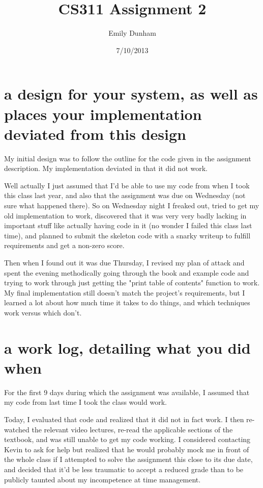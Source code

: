 \documentclass[10pt]{article}
\title{CS311 Assignment 2}
\author{Emily Dunham}
\date{7/10/2013}
\begin{document}
\maketitle

\section{a design for your system, as well as places your implementation deviated from this design}

My initial design was to follow the outline for the code given in the
assignment description. My implementation deviated in that it did not work.

Well actually I just assumed that I'd be able to use my code from when I took this class
last year, and also that the assignment was due on Wednesday (not sure what happened there). 
So on Wednesday night I freaked out, tried to get my old implementation to work, discovered 
that it was very very badly lacking in important stuff like actually having code in it (no wonder 
I failed this class last time), and planned to submit the skeleton code with a snarky writeup
to fulfill requirements and get a non-zero score. 

Then when I found out it was due Thursday, I revised my plan of attack and spent the evening 
methodically going through the book and example code and trying to work through just getting
the "print table of contents" function to work. My final implementation still doesn't match 
the project's requirements, but I learned a lot about how much time it takes to do things, 
and which techniques work versus which don't.

\section{a work log, detailing what you did when}

For the first 9 days during which the assignment was available, I assumed that
my code from last time I took the class would work. 

Today, I evaluated that code and realized that it did not in fact work. I then
re-watched the relevant video lectures, re-read the applicable sections of the
textbook, and was still unable to get my code working. I considered contacting
Kevin to ask for help but realized that he would probably mock me in front of
the whole class if I attempted to solve the assignment this close to its due
date, and decided that it'd be less traumatic to accept a reduced grade than
to be publicly taunted about my incompetence at time management. 
\end{document}
